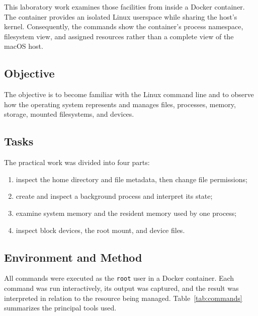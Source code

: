 \documentclass[12pt]{article}
\newcommand{\commandname}[1]{\texttt{#1}}
\begin{document}
This laboratory work examines those facilities from inside a Docker container. The container provides an isolated Linux userspace while sharing the host's kernel. Consequently, the commands show the container's process namespace, filesystem view, and assigned resources rather than a complete view of the macOS host.

\subsection{Objective}

The objective is to become familiar with the Linux command line and to observe how the operating system represents and manages files, processes, memory, storage, mounted filesystems, and devices.

\subsection{Tasks}

The practical work was divided into four parts:

\begin{enumerate}
    \item inspect the home directory and file metadata, then change file permissions;
    \item create and inspect a background process and interpret its state;
    \item examine system memory and the resident memory used by one process;
    \item inspect block devices, the root mount, and device files.
\end{enumerate}

\subsection{Environment and Method}

All commands were executed as the \commandname{root} user in a Docker container. Each command was run interactively, its output was captured, and the result was interpreted in relation to the resource being managed. Table~\ref{tab:commands} summarizes the principal tools used.
\end{document}
